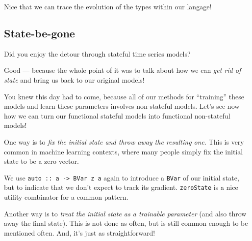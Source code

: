 \documentclass[]{article}
\newenvironment{Shaded}{}{}
\newcommand{\CommentTok}[1]{\textcolor[rgb]{0.38,0.63,0.69}{\textit{#1}}}
\newcommand{\DataTypeTok}[1]{\textcolor[rgb]{0.56,0.13,0.00}{#1}}
\newcommand{\DecValTok}[1]{\textcolor[rgb]{0.25,0.63,0.44}{#1}}
\newcommand{\FunctionTok}[1]{\textcolor[rgb]{0.02,0.16,0.49}{#1}}
\newcommand{\NormalTok}[1]{#1}
\newcommand{\OperatorTok}[1]{\textcolor[rgb]{0.40,0.40,0.40}{#1}}
\newcommand{\OtherTok}[1]{\textcolor[rgb]{0.00,0.44,0.13}{#1}}
\begin{document}
Nice that we can trace the evolution of the types within our langage!

\hypertarget{state-be-gone}{%
\subsection{State-be-gone}\label{state-be-gone}}

Did you enjoy the detour through stateful time series models?

Good --- because the whole point of it was to talk about how we can \emph{get
rid of state} and bring us back to our original models!

You knew this day had to come, because all of our methods for ``training'' these
models and learn these parameters involves non-stateful models. Let's see now
how we can turn our functional stateful models into functional non-stateful
models!

One way is to \emph{fix the initial state and throw away the resulting one}.
This is very common in machine learning contexts, where many people simply fix
the initial state to be a zero vector.

\begin{Shaded}
\end{Shaded}

We use \texttt{auto\ ::\ a\ -\textgreater{}\ BVar\ z\ a} again to introduce a
\texttt{BVar} of our initial state, but to indicate that we don't expect to
track its gradient. \texttt{zeroState} is a nice utility combinator for a common
pattern.

Another way is to \emph{treat the initial state as a trainable parameter} (and
also throw away the final state). This is not done as often, but is still common
enough to be mentioned often. And, it's just as straightforward!
\end{document}
